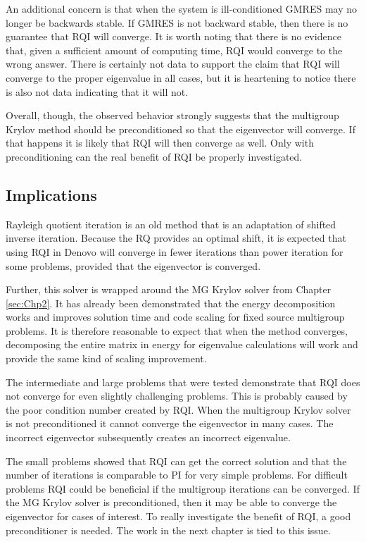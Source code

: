 An additional concern is that when the system is ill-conditioned GMRES may no longer be backwards stable. If GMRES is not backward stable, then there is no guarantee that RQI will converge. It is worth noting that there is no evidence that, given a sufficient amount of computing time, RQI would converge to the wrong answer. There is certainly not data to support the claim that RQI will converge to the proper eigenvalue in all cases, but it is heartening to notice there is also not data indicating that it will not. 

Overall, though, the observed behavior strongly suggests that the multigroup Krylov method should be preconditioned so that the eigenvector will converge. If that happens it is likely that RQI will then converge as well. Only with preconditioning can the real benefit of RQI be properly investigated.

\subsection{Implications}
Rayleigh quotient iteration is an old method that is an adaptation of shifted inverse iteration. Because the RQ provides an optimal shift, it is expected that using RQI in Denovo will converge in fewer iterations than power iteration for some problems, provided that the eigenvector is converged. 

Further, this solver is wrapped around the MG Krylov solver from Chapter \ref{sec:Chp2}. It has already been demonstrated that the energy decomposition works and improves solution time and code scaling for fixed source multigroup problems. It is therefore reasonable to expect that when the method converges, decomposing the entire matrix in energy for eigenvalue calculations will work and provide the same kind of scaling improvement.

The intermediate and large problems that were tested demonstrate that RQI does not converge for even slightly challenging problems. This is probably caused by the poor condition number created by RQI. When the multigroup Krylov solver is not preconditioned it cannot converge the eigenvector in many cases. The incorrect eigenvector subsequently creates an incorrect eigenvalue. 

The small problems showed that RQI can get the correct solution and that the number of iterations is comparable to PI for very simple problems. For difficult problems RQI could be beneficial if the multigroup iterations can be converged. If the MG Krylov solver is preconditioned, then it may be able to converge the eigenvector for cases of interest. To really investigate the benefit of RQI, a good preconditioner is needed. The work in the next chapter is tied to this issue.

